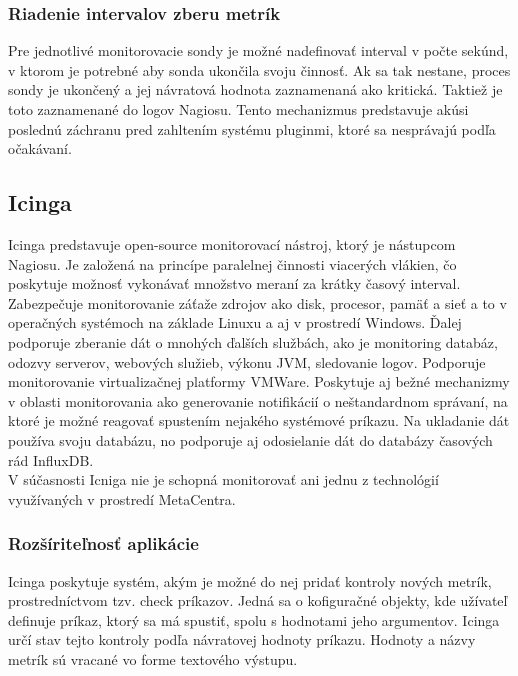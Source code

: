 \documentclass[printed,11pt,twoside,color,cover,table]{fithesis3}
\begin{document}
\subsubsection{Riadenie intervalov zberu metrík}
Pre jednotlivé monitorovacie sondy je možné nadefinovať interval v počte sekúnd, v ktorom je potrebné aby sonda ukončila svoju činnosť. Ak sa tak nestane, proces sondy je ukončený a jej návratová hodnota
zaznamenaná ako kritická. Taktiež je toto zaznamenané do logov Nagiosu. Tento mechanizmus predstavuje akúsi poslednú záchranu pred zahltením systému pluginmi, ktoré sa nesprávajú podľa očakávaní.

\subsection{Icinga}
Icinga predstavuje open-source monitorovací nástroj, ktorý je nástupcom Nagiosu. Je založená na princípe paralelnej činnosti viacerých vlákien, čo poskytuje možnosť vykonávať množstvo meraní
za krátky časový interval. Zabezpečuje monitorovanie záťaže zdrojov ako disk, procesor, pamäť a sieť a to v operačných systémoch na základe Linuxu a aj v prostredí Windows. Ďalej podporuje zberanie
dát o mnohých ďalších službách, ako je monitoring databáz, odozvy serverov, webových služieb, výkonu JVM, sledovanie logov. Podporuje monitorovanie virtualizačnej platformy VMWare. 
Poskytuje aj bežné mechanizmy v oblasti monitorovania ako generovanie notifikácií o neštandardnom správaní, na ktoré je možné reagovať spustením nejakého systémové príkazu. Na ukladanie dát 
používa svoju databázu, no podporuje aj odosielanie dát do databázy časových rád InfluxDB.
\\V súčasnosti Icniga nie je schopná monitorovať ani jednu z technológií využívaných v prostredí MetaCentra.

\subsubsection{Rozšíriteľnosť aplikácie}
Icinga poskytuje systém, akým je možné do nej pridať kontroly nových metrík, prostredníctvom tzv. check príkazov. Jedná sa o kofiguračné objekty, kde užívateľ definuje príkaz,
ktorý sa má spustiť, spolu s hodnotami jeho argumentov. Icinga určí stav tejto kontroly podľa návratovej hodnoty príkazu.\cite{icinga-plugin}
Hodnoty a názvy metrík sú vracané vo forme textového výstupu.
\end{document}
